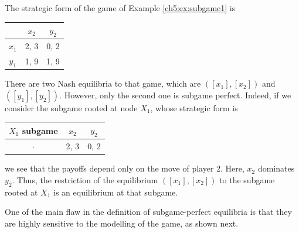 \begin{example}
The strategic form of the game of Example \ref{ch5:ex:subgame1}
is 
\begin{center}
\begin{tabular}{c|cc}
& $x_2$ & $y_2$ \\
\hline 
$x_1$ & 2,  3 & 0, 2 \\
$y_1$ & 1, 9 & 1, 9
\end{tabular}
\end{center}
There are two Nash equilibria to that game, which are $([x_1], [x_2])$ and $([y_1], [y_2])$. However, only the second one is subgame perfect. Indeed, if we consider the subgame rooted at node $X_1$, whose strategic form is 
\begin{center}
\begin{tabular}{c|cc}
$X_1$ subgame & $x_2$ & $y_2$ \\
\hline
$\cdot$ & 2, 3 & 0, 2 \\
\end{tabular}
\end{center}
we see that the payoffs depend only on the move of player 2. Here, $x_2$ dominates $y_2$. Thus, the restriction of the equilibrium $([x_1], [x_2])$ to the subgame rooted at $X_1$ is an equilibrium at that subgame.\\
\end{example}
One of the main flaw in the definition of subgame-perfect equilibria is that they are highly sensitive to the modelling of the game, as shown next.

